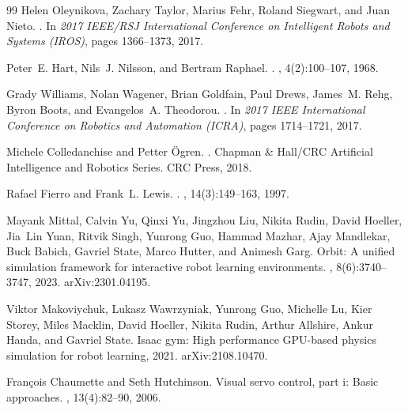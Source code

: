 \documentclass[10pt]{article}
\begin{document}
\begin{thebibliography}{99}
Helen Oleynikova, Zachary Taylor, Marius Fehr, Roland Siegwart, and Juan Nieto.
.
\newblock In {\em 2017 IEEE/RSJ International Conference on Intelligent Robots
  and Systems (IROS)}, pages 1366--1373, 2017.

Peter~E. Hart, Nils~J. Nilsson, and Bertram Raphael.
.
,
  4(2):100--107, 1968.

Grady Williams, Nolan Wagener, Brian Goldfain, Paul Drews, James~M. Rehg, Byron
  Boots, and Evangelos~A. Theodorou.
.
\newblock In {\em 2017 IEEE International Conference on Robotics and Automation
  (ICRA)}, pages 1714--1721, 2017.

Michele Colledanchise and Petter {\"O}gren.
.
\newblock Chapman \& Hall/CRC Artificial Intelligence and Robotics Series. CRC
  Press, 2018.

Rafael Fierro and Frank~L. Lewis.
.
, 14(3):149--163, 1997.

Mayank Mittal, Calvin Yu, Qinxi Yu, Jingzhou Liu, Nikita Rudin, David Hoeller,
  Jia~Lin Yuan, Ritvik Singh, Yunrong Guo, Hammad Mazhar, Ajay Mandlekar, Buck
  Babich, Gavriel State, Marco Hutter, and Animesh Garg.
\newblock Orbit: A unified simulation framework for interactive robot learning
  environments.
, 8(6):3740--3747, 2023.
\newblock arXiv:2301.04195.

Viktor Makoviychuk, Lukasz Wawrzyniak, Yunrong Guo, Michelle Lu, Kier Storey,
  Miles Macklin, David Hoeller, Nikita Rudin, Arthur Allshire, Ankur Handa, and
  Gavriel State.
\newblock Isaac gym: High performance {GPU}-based physics simulation for robot
  learning, 2021.
\newblock arXiv:2108.10470.

Fran\c{c}ois Chaumette and Seth Hutchinson.
\newblock Visual servo control, part i: Basic approaches.
, 13(4):82--90, 2006.


\end{thebibliography}
\end{document}
